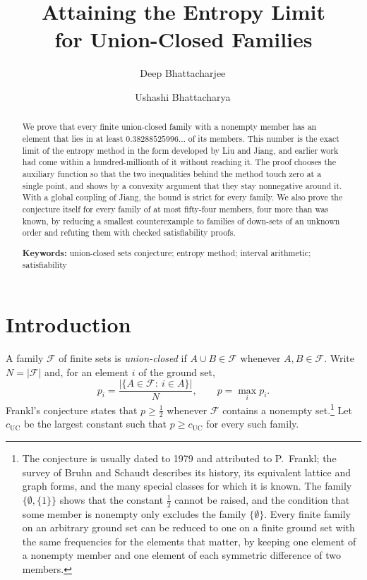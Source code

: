 \documentclass[12pt]{article}
\title{Attaining the Entropy Limit\\ for Union-Closed Families}
\author{Deep Bhattacharjee\,\orcidlink{0000-0003-0466-750X}\authornote{1,2}
\and
Ushashi Bhattacharya\,\orcidlink{0009-0002-2254-3914}\authornote{3}}
\theoremstyle{plain}
\newcommand{\cF}{\mathcal{F}}
\begin{document}
\maketitle

\begin{abstract}
We prove that every finite union-closed family with a nonempty member has an element that lies in at least $0.38288525996\ldots$ of its members. This number is the exact limit of the entropy method in the form developed by Liu and Jiang, and earlier work had come within a hundred-millionth of it without reaching it. The proof chooses the auxiliary function so that the two inequalities behind the method touch zero at a single point, and shows by a convexity argument that they stay nonnegative around it. With a global coupling of Jiang, the bound is strict for every family. We also prove the conjecture itself for every family of at most fifty-four members, four more than was known, by reducing a smallest counterexample to families of down-sets of an unknown order and refuting them with checked satisfiability proofs.

\medskip\noindent\textbf{Keywords:} union-closed sets conjecture; entropy method; interval arithmetic; satisfiability
\end{abstract}

\tableofcontents

\section{Introduction}\label{sec:intro}

A family $\cF$ of finite sets is \emph{union-closed} if $A\cup B\in\cF$ whenever $A,B\in\cF$. Write $N=|\cF|$ and, for an element $i$ of the ground set,
\[
p_i=\frac{|\{A\in\cF:\ i\in A\}|}{N},\qquad p=\max_i p_i .
\]
Frankl's conjecture states that $p\ge \tfrac12$ whenever $\cF$ contains a nonempty set.\footnote{The conjecture is usually dated to 1979 and attributed to P.~Frankl; the survey of Bruhn and Schaudt \cite{BS15} describes its history, its equivalent lattice and graph forms, and the many special classes for which it is known. The family $\{\emptyset,\{1\}\}$ shows that the constant $\tfrac12$ cannot be raised, and the condition that some member is nonempty only excludes the family $\{\emptyset\}$. Every finite family on an arbitrary ground set can be reduced to one on a finite ground set with the same frequencies for the elements that matter, by keeping one element of a nonempty member and one element of each symmetric difference of two members.} Let $c_{\mathrm{UC}}$ be the largest constant such that $p\ge c_{\mathrm{UC}}$ for every such family.
\end{document}

